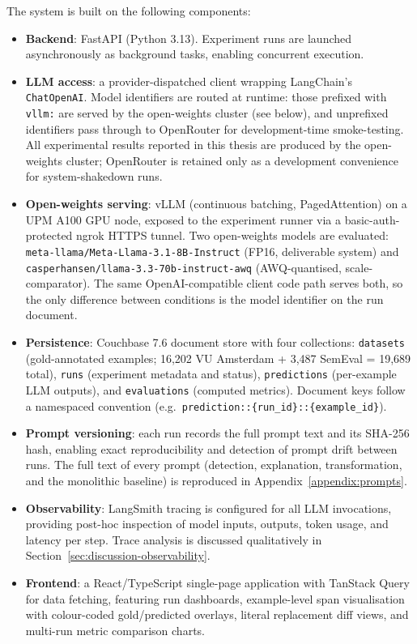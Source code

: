 The system is built on the following components:
\begin{itemize}
    \item \textbf{Backend}: FastAPI (Python 3.13). Experiment runs are launched asynchronously as background tasks, enabling concurrent execution.
    \item \textbf{LLM access}: a provider-dispatched client wrapping LangChain's \texttt{ChatOpenAI}. Model identifiers are routed at runtime: those prefixed with \texttt{vllm:} are served by the open-weights cluster (see below), and unprefixed identifiers pass through to OpenRouter for development-time smoke-testing. All experimental results reported in this thesis are produced by the open-weights cluster; OpenRouter is retained only as a development convenience for system-shakedown runs.
    \item \textbf{Open-weights serving}: vLLM (continuous batching, PagedAttention) on a UPM A100 GPU node, exposed to the experiment runner via a basic-auth-protected ngrok HTTPS tunnel. Two open-weights models are evaluated: \texttt{meta-llama/\allowbreak Meta-Llama-3.1-8B-\allowbreak Instruct} (FP16, deliverable system) and \texttt{casperhansen/\allowbreak llama-3.3-70b-\allowbreak instruct-awq} (AWQ-quantised, scale-comparator). The same OpenAI-compatible client code path serves both, so the only difference between conditions is the model identifier on the run document.
    \item \textbf{Persistence}: Couchbase 7.6 document store with four collections: \texttt{datasets} (gold-annotated examples; 16{,}202 VU Amsterdam + 3{,}487 SemEval = 19{,}689 total), \texttt{runs} (experiment metadata and status), \texttt{predictions} (per-example LLM outputs), and \texttt{evaluations} (computed metrics). Document keys follow a namespaced convention (e.g.\ \texttt{prediction::\allowbreak\{run\_id\}::\allowbreak\{example\_id\}}).
    \item \textbf{Prompt versioning}: each run records the full prompt text and its SHA-256 hash, enabling exact reproducibility and detection of prompt drift between runs. The full text of every prompt (detection, explanation, transformation, and the monolithic baseline) is reproduced in Appendix~\ref{appendix:prompts}.
    \item \textbf{Observability}: LangSmith tracing is configured for all LLM invocations, providing post-hoc inspection of model inputs, outputs, token usage, and latency per step. Trace analysis is discussed qualitatively in Section~\ref{sec:discussion-observability}.
    \item \textbf{Frontend}: a React/TypeScript single-page application with TanStack Query for data fetching, featuring run dashboards, example-level span visualisation with colour-coded gold/predicted overlays, literal replacement diff views, and multi-run metric comparison charts.
\end{itemize}

